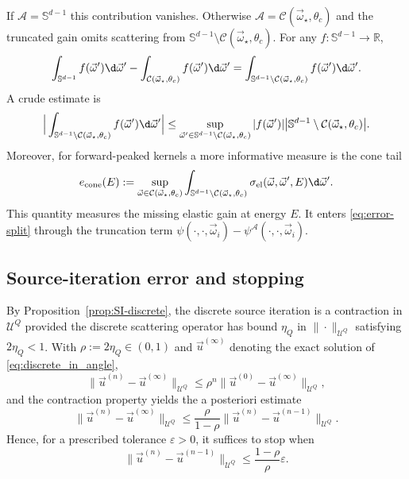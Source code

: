 \documentclass[final]{amsart}
\begin{document}
If $\mathcal A=\mathbb S^{d-1}$ this contribution vanishes. Otherwise
$\mathcal A=\mathcal C(\vec\omega_\star,\theta_c)$ and the truncated gain
omits scattering from $\mathbb S^{d-1}\setminus\mathcal C(\vec\omega_\star,\theta_c)$.
For any $f:\mathbb S^{d-1}\to\mathbb R$,
\[
  \int_{\mathbb S^{d-1}} f(\vec\omega') \d\vec\omega'
  -
  \int_{\mathcal C(\vec\omega_\star,\theta_c)} f(\vec\omega') \d\vec\omega'
  =
  \int_{\mathbb S^{d-1}\setminus\mathcal C(\vec\omega_\star,\theta_c)}
  f(\vec\omega') \d\vec\omega'.
\]
A crude estimate is
\begin{equation}
  \label{eq:cone_bound}
  \Big|\int_{\mathbb S^{d-1}\setminus\mathcal C(\vec\omega_\star,\theta_c)}
  f(\vec\omega') \d\vec\omega'\Big|
  \le
  \sup_{\vec\omega'\in\mathbb S^{d-1}\setminus\mathcal C(\vec\omega_\star,\theta_c)}
  |f(\vec\omega')| 
  \big|\mathbb S^{d-1}\setminus\mathcal C(\vec\omega_\star,\theta_c)\big|.
\end{equation}
Moreover, for forward-peaked kernels a more informative measure is the
cone tail
\[
  e_{\mathrm{cone}}(E)
  :=
  \sup_{\vec\omega\in\mathcal C(\vec\omega_\star,\theta_c)}
  \int_{\mathbb S^{d-1}\setminus\mathcal C(\vec\omega_\star,\theta_c)}
  \sigma_{\mathrm{el}}(\vec\omega,\vec\omega',E) \d\vec\omega'.
\]
This quantity measures the missing elastic gain at energy $E$. It enters
\eqref{eq:error-split} through the truncation term
$\psi(\cdot,\cdot,\vec\omega_i)-\psi^{\mathcal A}(\cdot,\cdot,\vec\omega_i)$.

\subsection{Source-iteration error and stopping}
\label{subsec:SIerror}

By Proposition~\ref{prop:SI-discrete}, the discrete source iteration is a
contraction in $\mathcal U^Q$ provided the discrete scattering operator
has bound $\eta_Q$ in $\|\cdot\|_{\mathcal U^Q}$ satisfying $2\eta_Q<1$.
With $\rho:=2\eta_Q\in(0,1)$ and $\vec u^{(\infty)}$ denoting the exact
solution of \eqref{eq:discrete_in_angle},
\begin{equation}
  \label{eq:iter-geometric}
  \|\vec u^{(n)}-\vec u^{(\infty)}\|_{\mathcal U^Q}
  \le
  \rho^n \|\vec u^{(0)}-\vec u^{(\infty)}\|_{\mathcal U^Q},
\end{equation}
and the contraction property yields the a posteriori estimate
\begin{equation}
  \label{eq:iter-apost}
  \|\vec u^{(n)}-\vec u^{(\infty)}\|_{\mathcal U^Q}
  \le
  \frac{\rho}{1-\rho} \|\vec u^{(n)}-\vec u^{(n-1)}\|_{\mathcal U^Q}.
\end{equation}
Hence, for a prescribed tolerance $\varepsilon>0$, it suffices to stop
when
\[
  \|\vec u^{(n)}-\vec u^{(n-1)}\|_{\mathcal U^Q}
  \le
  \frac{1-\rho}{\rho} \varepsilon.
\]
\end{document}
